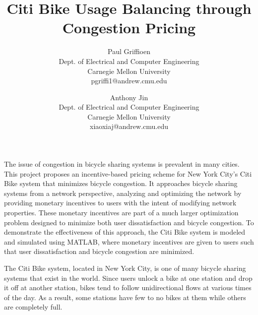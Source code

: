 \documentclass[times, 10pt,twocolumn]{article}
\begin{document}
\title{Citi Bike Usage Balancing through Congestion Pricing}

\author{Paul Griffioen\\Dept. of Electrical and Computer Engineering\\Carnegie Mellon University\\ pgriffi1@andrew.cmu.edu\\
\and
Anthony Jin\\Dept. of Electrical and Computer Engineering\\Carnegie Mellon University\\xiaoxiaj@andrew.cmu.edu\\
}

\maketitle
\thispagestyle{empty}


The issue of congestion in bicycle sharing systems is prevalent in many cities. This project proposes an incentive-based pricing scheme for New York City's Citi Bike system that minimizes bicycle congestion. It approaches bicycle sharing systems from a network perspective, analyzing and optimizing the network by providing monetary incentives to users with the intent of modifying network properties. These monetary incentives are part of a much larger optimization problem designed to minimize both user dissatisfaction and bicycle congestion. To demonstrate the effectiveness of this approach, the Citi Bike system is modeled and simulated using MATLAB, where monetary incentives are given to users such that user dissatisfaction and bicycle congestion are minimized.


The Citi Bike system, located in New York City, is one of many bicycle sharing systems that exist in the world. Since users unlock a bike at one station and drop it off at another station, bikes tend to follow unidirectional flows at various times of the day. As a result, some stations have few to no bikes at them while others are completely full.
\end{document}
